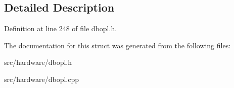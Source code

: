 \subsection{Detailed Description}


Definition at line 248 of file dbopl.\-h.



The documentation for this struct was generated from the following files\-:\begin{DoxyCompactItemize}
\item 
src/hardware/dbopl.\-h\item 
src/hardware/dbopl.\-cpp\end{DoxyCompactItemize}
